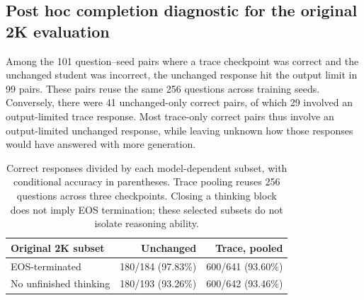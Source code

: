 \subsection{Post hoc completion diagnostic for the original 2K evaluation}
Among the 101 question--seed pairs where a trace checkpoint was correct and the unchanged student was incorrect, the unchanged response hit the output limit in 99 pairs. These pairs reuse the same 256 questions across training seeds. Conversely, there were 41 unchanged-only correct pairs, of which 29 involved an output-limited trace response. Most trace-only correct pairs thus involve an output-limited unchanged response, while leaving unknown how those responses would have answered with more generation.
\par\begin{table}[ht]\centering\small\begin{tabular}{lrr}\toprule
Original 2K subset & Unchanged & Trace, pooled \\
\midrule
EOS-terminated & 180/184 (97.83\%) & 600/641 (93.60\%) \\
No unfinished thinking & 180/193 (93.26\%) & 600/642 (93.46\%) \\
\bottomrule\end{tabular}\caption{Correct responses divided by each model-dependent subset, with conditional accuracy in parentheses. Trace pooling reuses 256 questions across three checkpoints. Closing a thinking block does not imply EOS termination; these selected subsets do not isolate reasoning ability.}\label{tab:original-completion}\end{table}\par
